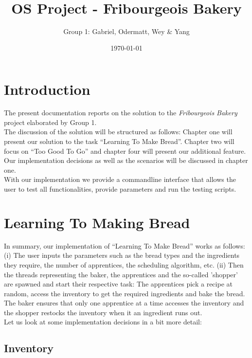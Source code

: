 \documentclass[11pt]{article}
\author{Group 1: Gabriel, Odermatt, Wey \& Yang}
\date{\today}
\title{OS Project - Fribourgeois Bakery}
\begin{document}
\maketitle
\tableofcontents

\setlength\parindent{0pt}
\setlength\parskip{-9pt}

\section{Introduction}
\label{sec:orga76a373}

The present documentation reports on the solution to the \emph{Fribourgeois Bakery} project elaborated by Group 1.\\

The discussion of the solution will be structured as follows: Chapter one will present our solution to the task ``Learning To Make Bread''. Chapter two will focus on ``Too Good To Go'' and chapter four will present our additional feature. Our implementation decisions as well as the scenarios will be discussed in chapter one.\\

With our implementation we provide a commandline interface that allows the user to test all functionalities, provide parameters and run the testing scripts.\\

\section{Learning To Making Bread}
\label{sec:org0103fc1}

In summary, our implementation of ``Learning To Make Bread'' works as follows: (i) The user inputs the parameters such as the bread types and the ingredients they require, the number of apprentices, the scheduling algorithm, etc. (ii) Then the threads representing the baker, the apprentices and the so-called 'shopper' are spawned and start their respective task: The apprentices pick a recipe at random, access the inventory to get the required ingredients and bake the bread. The baker ensures that only one apprentice at a time accesses the inventory and the shopper restocks the inventory when it an ingredient runs out.\\

Let us look at some implementation decisions in a bit more detail:\\

\subsection{Inventory}
\label{sec:org437f673}
\end{document}
